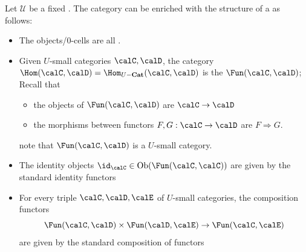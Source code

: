 \begin{definition} \label{definition:2_category_of_categories_relative_to_a_grothendieck_universe}
    Let $\mathcal{U}$ be a fixed .
    The category  can be enriched with the structure of a  as follows:
    \begin{itemize}
        \item The objects/$0$-cells are all .
        \item Given $U$-small categories $\calC,\calD$, the category $\Hom(\calC,\calD) = \Hom_{U-\mathbf{Cat}}(\calC,\calD)$ is the  $\Fun(\calC,\calD)$; Recall that 
        \begin{itemize}
            \item the objects of $\Fun(\calC,\calD)$ are  $\calC \to \calD$
            \item the morphisms between functors $F,G: \calC \to \calD$ are  $F \Rightarrow G$.
        \end{itemize}
        note that $\Fun(\calC,\calD)$ is a $U$-small category. 

        \item The identity objects $\id_\calC \in \operatorname{Ob}(\Fun(\calC,\calC))$ are given by the standard identity functors
        \item For every triple $\calC, \calD, \calE$ of $U$-small categories, the composition functors
        $$\Fun(\calC,\calD) \times \Fun(\calD,\calE) \to \Fun(\calC,\calE)$$
        are given by the standard composition of functors
    \end{itemize}
\end{definition}